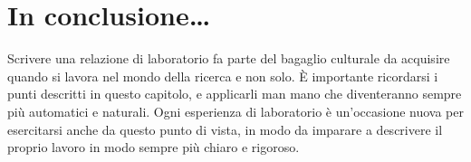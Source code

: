 \section{In conclusione\ldots}

Scrivere una relazione di laboratorio fa parte del bagaglio culturale da
acquisire quando si lavora nel mondo della ricerca e non solo. \`E importante
ricordarsi i punti descritti in questo capitolo, e applicarli man mano che
diventeranno sempre più automatici e naturali.
Ogni esperienza di laboratorio è un'occasione nuova per esercitarsi anche da
questo punto di vista, in modo da imparare a descrivere il proprio lavoro in
modo sempre più chiaro e rigoroso.
